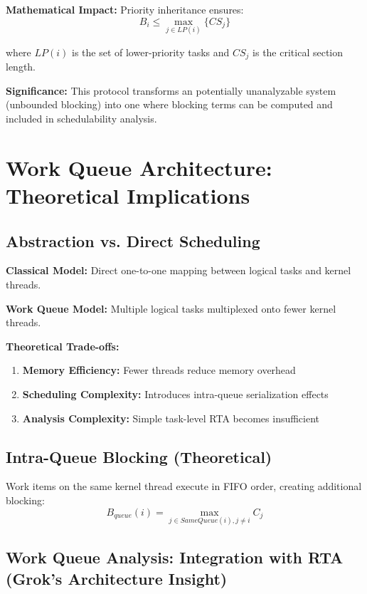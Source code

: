 \documentclass[12pt,a4paper]{article}
\begin{document}
\textbf{Mathematical Impact:} Priority inheritance ensures:
\begin{equation}
B_i \leq \max_{j \in LP(i)} \{CS_j\}
\end{equation}

where $LP(i)$ is the set of lower-priority tasks and $CS_j$ is the critical section length.

\textbf{Significance:} This protocol transforms an potentially unanalyzable system (unbounded blocking) into one where blocking terms can be computed and included in schedulability analysis.

\section{Work Queue Architecture: Theoretical Implications}

\subsection{Abstraction vs. Direct Scheduling}

\textbf{Classical Model:} Direct one-to-one mapping between logical tasks and kernel threads.

\textbf{Work Queue Model:} Multiple logical tasks multiplexed onto fewer kernel threads.

\textbf{Theoretical Trade-offs:}
\begin{enumerate}
\item \textbf{Memory Efficiency:} Fewer threads reduce memory overhead
\item \textbf{Scheduling Complexity:} Introduces intra-queue serialization effects
\item \textbf{Analysis Complexity:} Simple task-level RTA becomes insufficient
\end{enumerate}

\subsection{Intra-Queue Blocking (Theoretical)}

Work items on the same kernel thread execute in FIFO order, creating additional blocking:
\begin{equation}
B_{queue}(i) = \max_{j \in SameQueue(i), j \neq i} C_j
\end{equation}

\subsection{Work Queue Analysis: Integration with RTA (Grok's Architecture Insight)}
\end{document}
